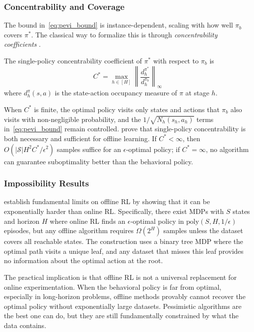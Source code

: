 \subsubsection{Concentrability and Coverage}

The bound in~\eqref{eq:pevi_bound} is instance-dependent, scaling with how well $\pi_b$ covers $\pi^*$. The classical way to formalize this is through \textit{concentrability coefficients} \citep{Munos2008}.

\begin{definition}
\label{def:concentrability}
The single-policy concentrability coefficient of $\pi^*$ with respect to $\pi_b$ is
\begin{equation}
C^* = \max_{h \in [H]} \left\| \frac{d_h^{\pi^*}}{d_h^{\pi_b}} \right\|_\infty
\end{equation}
where $d_h^{\pi}(s,a)$ is the state-action occupancy measure of $\pi$ at stage $h$.
\end{definition}

When $C^*$ is finite, the optimal policy visits only states and actions that $\pi_b$ also visits with non-negligible probability, and the $1/\sqrt{N_h(s_h, a_h)}$ terms in~\eqref{eq:pevi_bound} remain controlled. \citet{Rashidinejad2021} prove that single-policy concentrability is both necessary and sufficient for offline learning. If $C^* < \infty$, then $O(|\mathcal{S}| H^2 C^* / \epsilon^2)$ samples suffice for an $\epsilon$-optimal policy; if $C^* = \infty$, no algorithm can guarantee suboptimality better than the behavioral policy.

\subsubsection{Impossibility Results}

\citet{Zanette2021} establish fundamental limits on offline RL by showing that it can be exponentially harder than online RL. Specifically, there exist MDPs with $S$ states and horizon $H$ where online RL finds an $\epsilon$-optimal policy in $\text{poly}(S, H, 1/\epsilon)$ episodes, but any offline algorithm requires $\Omega(2^H)$ samples unless the dataset covers all reachable states. The construction uses a binary tree MDP where the optimal path visits a unique leaf, and any dataset that misses this leaf provides no information about the optimal action at the root.

The practical implication is that offline RL is not a universal replacement for online experimentation. When the behavioral policy is far from optimal, especially in long-horizon problems, offline methods provably cannot recover the optimal policy without exponentially large datasets. Pessimistic algorithms are the best one can do, but they are still fundamentally constrained by what the data contains.

